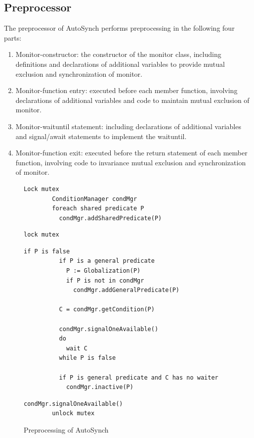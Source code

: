 \documentclass[preprint]{sigplanconf}
\begin{document}
\subsection{Preprocessor}
The preprocessor of AutoSynch performs preprocessing in the following four 
parts:
\begin{enumerate}
  \item Monitor-constructor: the constructor of the monitor class, including 
    definitions and declarations of additional variables to provide mutual 
    exclusion and synchronization of monitor. 
  \item Monitor-function entry: executed before each member function, 
    involving declarations of additional variables and code to maintain
    mutual exclusion of monitor. 
  \item Monitor-waituntil statement: including declarations of additional
    variables and signal/await statements to implement the waituntil.
  \item Monitor-function exit: executed before the return statement of 
    each member function, involving code to invariance mutual exclusion and 
    synchronization of monitor. 
\end{enumerate}
\begin{figure}[ht!]
    \begin{Verbatim}[fontsize=\footnotesize,gobble=8,frame=topline,
            framesep=3mm,label=\fbox{\small\emph{Constructor}}]
        Lock mutex
        ConditionManager condMgr 
        foreach shared predicate P
          condMgr.addSharedPredicate(P)
    \end{Verbatim}
    \begin{Verbatim}[fontsize=\footnotesize,gobble=8,frame=topline,
            framesep=3mm,label=\fbox{\small\emph{Entry}}]
        lock mutex
    \end{Verbatim}
    \begin{Verbatim}[fontsize=\footnotesize,gobble=8,frame=topline,
            framesep=3mm,label=\fbox{\small\emph{Waituntil(P)}}]
        if P is false 
          if P is a general predicate 
            P := Globalization(P)
            if P is not in condMgr
              condMgr.addGeneralPredicate(P)
              
          C = condMgr.getCondition(P)
        
          condMgr.signalOneAvailable()
          do 
            wait C
          while P is false
       
          if P is general predicate and C has no waiter
            condMgr.inactive(P) 
    \end{Verbatim}
    \begin{Verbatim}[fontsize=\footnotesize,gobble=8,frame=lines,
            framesep=3mm,label=\fbox{\small\emph{Exit}}]
        condMgr.signalOneAvailable() 
        unlock mutex
    \end{Verbatim}
  \caption{Preprocessing of AutoSynch}
  \label{fig:prep}
\end{figure}  
\end{document}
